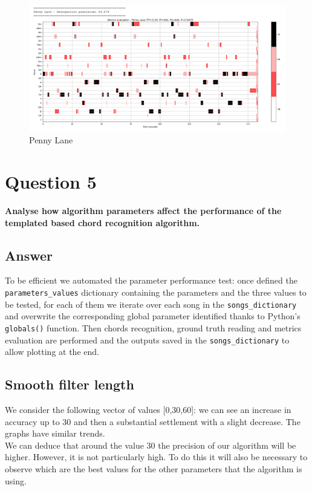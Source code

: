 \documentclass[
	12pt, %
]{fphw}
\begin{document}
{\begin{figure}[H]
 \centering
 \includegraphics[scale=1]{./images/4_penny_lane_metrics.png}
 \caption{Penny Lane}
\end{figure}


\section*{\color{red}Question 5}

\begin{problem}
	\textbf{Analyse how algorithm parameters affect the performance of the templated based chord recognition algorithm.}
\end{problem}

\subsection*{\color{blue}Answer}

To be efficient we automated the parameter performance test: once defined the \verb|parameters_values| dictionary containing the parameters and the three values to be tested, for each of them we iterate over each song in the \verb|songs_dictionary| and overwrite the corresponding global parameter identified thanks to Python's \verb|globals()| function.
Then chords recognition, ground truth reading and metrics evaluation are performed and the outputs saved in the \verb|songs_dictionary| to allow plotting at the end.

\subsection*{Smooth filter length} 

We consider the following vector of values [0,30,60]: we can see an increase in accuracy up to 30 and then a substantial settlement with a slight decrease. The graphs have similar trends.\\
We can deduce that around the value 30 the precision of our algorithm will be higher. However, it is not particularly high. To do this it will also be necessary to observe which are the best values for the other parameters that the algorithm is using. \\

}
\end{document}
